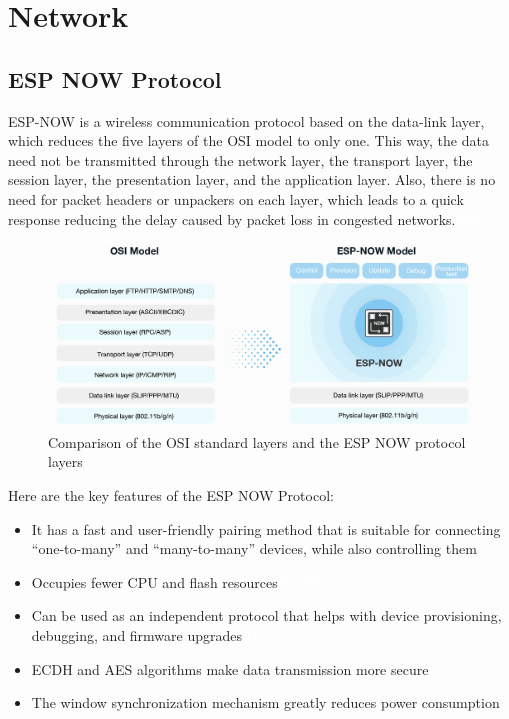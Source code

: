 \newpage
\section{Network}
\subsection{ESP NOW Protocol}
ESP-NOW is a wireless communication protocol based on the data-link layer, which reduces the five layers of the \gls{OSI model} to only one. This way, the data need not be transmitted through the network layer, the transport layer, the session layer, the presentation layer, and the application layer. Also, there is no need for packet headers or unpackers on each layer, which leads to a quick response reducing the delay caused by packet loss in congested networks.{\tiny \textcolor{white}{\ac{OSI}}}
\begin{figure}[H]
    \centering
    \includegraphics[width=0.75\linewidth]{Files/Images/model-en.png}
    \caption{Comparison of the OSI standard layers and the ESP NOW protocol layers}
    \label{fig:enter-label}
\end{figure}
Here are the key features of the ESP NOW Protocol:
\begin{itemize}
    \item It has a fast and user-friendly pairing method that is suitable for connecting “one-to-many” and “many-to-many” devices, while also controlling them
    \item Occupies fewer CPU and flash resources{\tiny \textcolor{white}{\ac{ECDH}}}
    \item Can be used as an independent protocol that helps with device provisioning, debugging, and firmware upgrades{\tiny \textcolor{white}{\ac{AES}}}
    \item  \gls{ECDH} and \gls{AES}  algorithms make data transmission more secure
    \item The window synchronization mechanism greatly reduces power consumption
\end{itemize}
